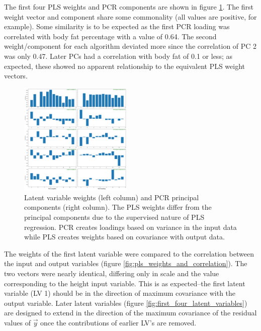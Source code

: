 \documentclass{IEEEtran}
\begin{document}
The first four PLS weights and PCR components are shown in figure \ref{fig:pls_vs_pcr_loadings}. The first weight vector and component share some commonality (all values are positive, for example). Some similarity is to be expected as the first PCR loading was correlated with body fat percentage with a value of \num{0.64}. The second weight/component for each algorithm deviated more since the correlation of PC 2 was only \num{0.47}. Later PCs had a correlation with body fat of \num{0.1} or less; as expected, these showed no apparent relationship to the equivalent PLS weight vectors.

\begin{centering}
\begin{figure}
\centering
\begin{center}
	\includegraphics[width=0.48\textwidth]{pls_vs_pcr_loadings}
	\caption{Latent variable weights (left column) and PCR principal components (right column). The PLS weights differ from the principal components due to the supervised nature of PLS regression. PCR creates loadings based on variance in the input data while PLS creates weights based on covariance with output data.\label{fig:pls_vs_pcr_loadings}}
\end{center}
\end{figure}
\end{centering}

The weights of the first latent variable were compared to the correlation between the input and output variables (figure \ref{fig:pls_weights_and_correlation}). The two vectors were nearly identical, differing only in scale and the value corresponding to the height input variable. This is as expected--the first latent variable (LV 1) should be in the direction of maximum covariance with the output variable. Later latent variables (figure \ref{fig:first_four_latent_variables}) are designed to extend in the direction of the maximum covariance of the residual values of $\vec{y}$ once the contributions of earlier LV's are removed.
\end{document}
